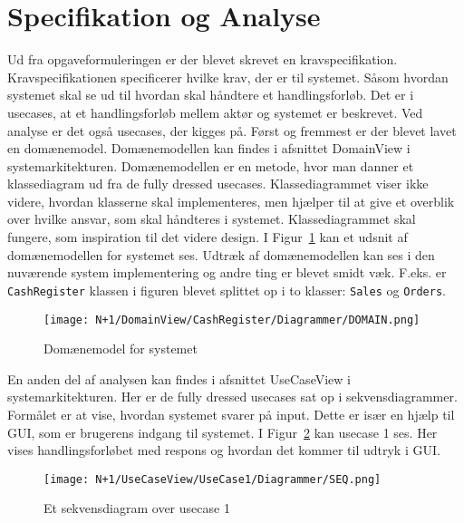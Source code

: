 \section{Specifikation og Analyse}
Ud fra opgaveformuleringen er der blevet skrevet en kravspecifikation. Kravspecifikationen specificerer hvilke krav, der er til \gls{system}et. Såsom hvordan \gls{system}et skal se ud til hvordan skal håndtere et handlingsforløb. Det er i \gls{usecase}s, at et handlingsforløb mellem aktør og \gls{system}et er beskrevet. Ved analyse er det også \gls{usecase}s, der kigges på.
\newline\newline
Først og fremmest er der blevet lavet en domænemodel. Domænemodellen kan findes i afsnittet DomainView i systemarkitekturen. Domænemodellen er en metode, hvor man danner et klassediagram ud fra de fully dressed \gls{usecase}s. Klassediagrammet viser ikke videre, hvordan klasserne skal implementeres, men hjælper til at give et overblik over hvilke ansvar, som skal håndteres i \gls{system}et. Klassediagrammet skal fungere, som inspiration til det videre design. 
\newline\newline
I Figur~\ref{fig:domainmodel} kan et udsnit af domænemodellen for \gls{system}et ses. Udtræk af domænemodellen kan ses i den nuværende system implementering og andre ting er blevet smidt væk. F.eks. er \texttt{CashRegister} klassen i figuren blevet splittet op i to klasser: \texttt{Sales} og \texttt{Orders}.

\begin{figure}[H]
	\centering
	\texttt{[image: N+1/DomainView/CashRegister/Diagrammer/DOMAIN.png]}
	\caption{Domænemodel for \Gls{system}et}
	\label{fig:domainmodel}
\end{figure}

En anden del af analysen kan findes i afsnittet UseCaseView i systemarkitekturen. Her er de fully dressed \gls{usecase}s sat op i sekvensdiagrammer. Formålet er at vise, hvordan \gls{system}et svarer på input. Dette er især en hjælp til \gls{GUI}, som er brugerens indgang til systemet. I Figur~\ref{fig:usecaseviewseq} kan \gls{usecase} 1 ses. Her vises handlingsforløbet med respons og hvordan det kommer til udtryk i \gls{GUI}.

\begin{figure}[H]
	\centering
	\texttt{[image: N+1/UseCaseView/UseCase1/Diagrammer/SEQ.png]}
	\caption{Et sekvensdiagram over \gls{usecase} 1}
	\label{fig:usecaseviewseq}
\end{figure}